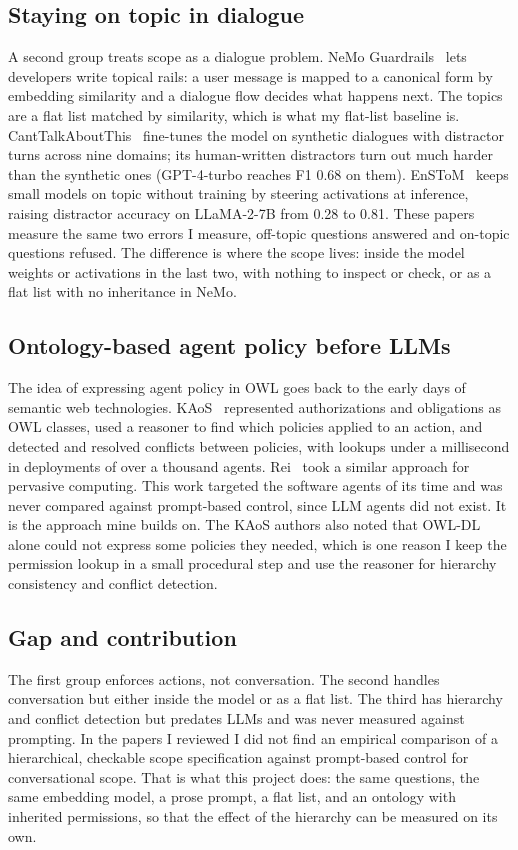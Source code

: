 \documentclass[conference]{IEEEtran}
\begin{document}
\subsection{Staying on topic in dialogue}
A second group treats scope as a dialogue problem. NeMo Guardrails~\cite{nemo} lets developers write topical rails: a user message is mapped to a canonical form by embedding similarity and a dialogue flow decides what happens next. The topics are a flat list matched by similarity, which is what my flat-list baseline is. CantTalkAboutThis~\cite{ctat} fine-tunes the model on synthetic dialogues with distractor turns across nine domains; its human-written distractors turn out much harder than the synthetic ones (GPT-4-turbo reaches F1 0.68 on them). EnSToM~\cite{enstom} keeps small models on topic without training by steering activations at inference, raising distractor accuracy on LLaMA-2-7B from 0.28 to 0.81. These papers measure the same two errors I measure, off-topic questions answered and on-topic questions refused. The difference is where the scope lives: inside the model weights or activations in the last two, with nothing to inspect or check, or as a flat list with no inheritance in NeMo.

\subsection{Ontology-based agent policy before LLMs}
The idea of expressing agent policy in OWL goes back to the early days of semantic web technologies. KAoS~\cite{kaos} represented authorizations and obligations as OWL classes, used a reasoner to find which policies applied to an action, and detected and resolved conflicts between policies, with lookups under a millisecond in deployments of over a thousand agents. Rei~\cite{rei} took a similar approach for pervasive computing. This work targeted the software agents of its time and was never compared against prompt-based control, since LLM agents did not exist. It is the approach mine builds on. The KAoS authors also noted that OWL-DL alone could not express some policies they needed, which is one reason I keep the permission lookup in a small procedural step and use the reasoner for hierarchy consistency and conflict detection.

\subsection{Gap and contribution}
The first group enforces actions, not conversation. The second handles conversation but either inside the model or as a flat list. The third has hierarchy and conflict detection but predates LLMs and was never measured against prompting. In the papers I reviewed I did not find an empirical comparison of a hierarchical, checkable scope specification against prompt-based control for conversational scope. That is what this project does: the same questions, the same embedding model, a prose prompt, a flat list, and an ontology with inherited permissions, so that the effect of the hierarchy can be measured on its own.
\end{document}
